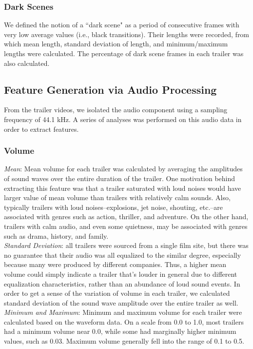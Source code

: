 \documentclass[letterpaper, 10 pt, conference]{ieeeconf}  %
\begin{document}
\subsubsection{Dark Scenes}
We defined the notion of a ``dark scene" as a period of consecutive frames with very low average values (i.e., black transitions). Their lengths were recorded, from which mean length, standard deviation of length, and minimum/maximum lengths were calculated. The percentage of dark scene frames in each trailer was also calculated. 

\subsection{Feature Generation via Audio Processing}
From the trailer videos, we isolated the audio component using a sampling frequency of 44.1 kHz. A series of analyses was performed on this audio data in order to extract features.

\subsubsection{Volume}
\textit{Mean}: Mean volume for each trailer was calculated by averaging the amplitudes of sound waves over the entire duration of the trailer. One motivation behind extracting this feature was that a trailer saturated with loud noises would have larger value of mean volume than trailers with relatively calm sounds. Also, typically trailers with loud noises--explosions, jet noise, shouting, etc.--are associated with genres such as action, thriller, and adventure. On the other hand, trailers with calm audio, and even some quietness, may be associated with genres such as drama, history, and family. \\
\indent\textit{Standard Deviation}: all trailers were sourced from a single film site, but there was no guarantee that their audio was all equalized to the similar degree, especially because many were produced by different companies. Thus, a higher mean volume could simply indicate a trailer that's louder in general due to different equalization characteristics, rather than an abundance of loud sound events. In order to get a sense of the variation of volume in each trailer, we calculated standard deviation of the sound wave amplitude over the entire trailer as well.\\
\indent\textit{Minimum and Maximum}: Minimum and maximum volume for each trailer were calculated based on the waveform data. On a scale from 0.0 to 1.0, most trailers had a minimum volume near 0.0, while some had marginally higher minimum values, such as 0.03. Maximum volume generally fell into the range of 0.1 to 0.5.
\end{document}
